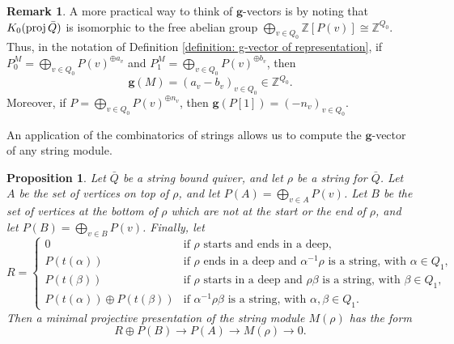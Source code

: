 \documentclass{memo-l}
\newtheorem{proposition}[theorem]{Proposition}
\theoremstyle{definition}
\newtheorem{remark}[theorem]{Remark}
\newcommand{\Z}{\mathbb{Z}} %
\renewcommand{\b}[1]{\mathbf{#1}} %
\newcommand{\proj}{\operatorname{{\rm proj}}}
\begin{document}
\begin{remark}
 A more practical way to think of $\b{g}$-vectors is by noting that $K_0(\proj \bar Q)$ is isomorphic to the free abelian group
 $\bigoplus_{v\in Q_0} \Z [P(v)] \cong \Z^{Q_0}$.  Thus, in the notation of Definition \ref{definition: g-vector of representation},
 if $P_0^M = \bigoplus_{v\in Q_0} \! P(v)^{\oplus a_v}$ and $P_1^M = \bigoplus_{v\in Q_0} \! P(v)^{\oplus b_v}$, 
 then
 \[
  \b{g}(M) = (a_v - b_v)_{v\in Q_0} \in \Z^{Q_0}.
 \] 
 Moreover, if $P = \bigoplus_{v\in Q_0}P(v)^{\oplus n_v}$, then $\b{g}(P[1]) = (-n_v)_{v\in Q_0}$.
\end{remark}

An application of the combinatorics of strings allows us to compute the $\b{g}$-vector of any string module.

\begin{proposition}
 Let $\bar Q$ be a string bound quiver, and let $\rho$ be a string for $\bar Q$.  
 Let $A$ be the set of vertices on top of $\rho$, and let $P(A) = \bigoplus_{v\in A} P(v)$.
 Let $B$ be the set of vertices at the bottom of $\rho$ which are not at the start or the end of $\rho$,
 and let $P(B) = \bigoplus_{v\in B} P(v)$.  Finally, let 
 \[
  R = \begin{cases}
          0 & \textrm{if $\rho$ starts and ends in a deep,} \\
          P({t(\alpha)})   & \textrm{if $\rho$ ends in a deep and $\alpha^{-1}\rho$ is a string, with $\alpha\in Q_1$,} \\
          P({t(\beta)})    & \textrm{if $\rho$ starts in a deep and $\rho\beta$ is a string, with $\beta\in Q_1$,} \\
          P({t(\alpha)}) \oplus P({t(\beta)})  & \textrm{if $\alpha^{-1}\rho\beta$ is a string, with $\alpha, \beta\in Q_1$.}
        \end{cases}
 \]
 Then a minimal projective presentation of the string module $M(\rho)$ has the form
 \[
  R\oplus P(B) \to P(A) \to M(\rho) \to 0.
 \]
\end{proposition}
\end{document}
